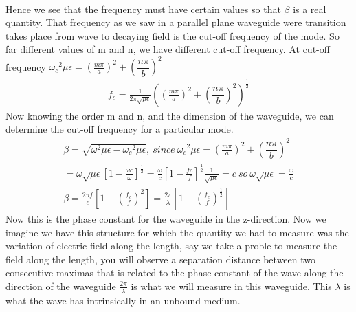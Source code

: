 	\paragraph{}Hence we see that the frequency must have certain values so that $\beta$ is a real quantity. That frequency as we saw in a parallel plane waveguide were transition takes place from wave to decaying field is the cut-off frequency of the mode. So far different values of m and n, we have different cut-off frequency. At cut-off frequency ${\omega_c}^2\mu\epsilon = (\frac{m\pi}{a})^2 + (\dfrac{n\pi}{b})^2$
	\begin{align}
	f_c = \frac{1}{2\pi \sqrt{\mu\epsilon}}((\frac{m\pi}{a})^2 + (\dfrac{n\pi}{b})^2)^{\frac{1}{2}}
	\end{align}
	Now knowing the order m and n, and the dimension of the waveguide, we can determine the cut-off frequency for a particular mode.
	\begin{align*}
	\beta = \sqrt{{\omega}^2\mu\epsilon-{\omega_c}^2\mu\epsilon},\ since\ {\omega_c}^2\mu\epsilon = (\frac{m\pi}{a})^2 + (\dfrac{n\pi}{b})^2\\
	=\omega\sqrt{\mu\epsilon}[1-{\frac{\omega c}{\omega}}]^{\frac{1}{2}} = \frac{\omega}{c} [1-{\frac{fc}{f}}]^{\frac{1}{2}} \frac{1}{\sqrt{\mu\epsilon}}=c\ so\ \omega{\sqrt{\mu\epsilon}}= \frac{\omega}{c}\\ \beta = \frac{2\pi f}{c}[1-(\frac{f_c}{f})^2]
	= \frac{2\pi}{\lambda}[1-(\frac{f_c}{f})^{\frac{1}{2}}]
	\end{align*}
	Now this is the phase constant for the waveguide in the z-direction. Now we imagine we have this structure for which the quantity we had to measure was the variation of electric field along the length, say we take a proble to measure the field along the length, you will observe a separation distance between two consecutive maximas that is related to the phase constant of the wave along the direction of the waveguide $\frac{2\pi}{\lambda}$ is what we will measure in this waveguide. This $\lambda$ is what the wave has intrinsically in an unbound medium.
